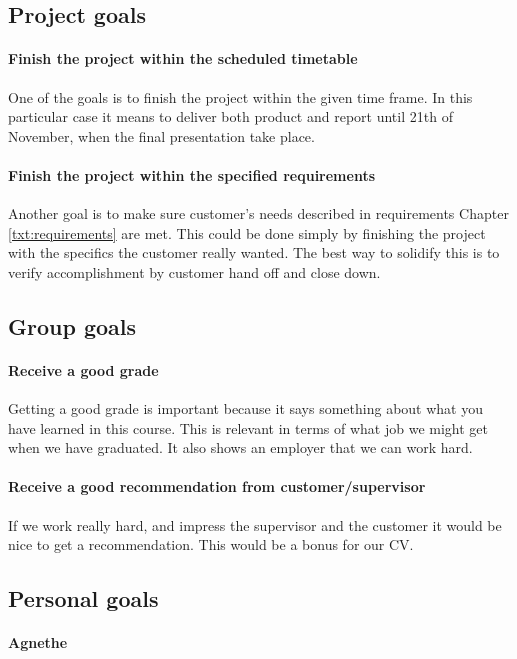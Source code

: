 \label{sec:project-goals}

\subsection{Project goals}

\paragraph{Finish the project within the scheduled timetable}
One of the goals is to finish the project within the given time frame. 
In this particular case it means to deliver both product and report until 21th of November, when the final presentation take place.

\paragraph{Finish the project within the specified requirements}
Another goal is to make sure customer's needs described in requirements Chapter \ref{txt:requirements} are met.
This could be done simply by finishing the project with the specifics the customer really wanted. 
The best way to solidify this is to verify accomplishment by customer hand off and close down.

\subsection{Group goals}
\paragraph{Receive a good grade}
Getting a good grade is important because it says something about what you have learned in this course. 
This is relevant in terms of what job we might get when we have graduated. It also shows an employer that we can work hard. 
\paragraph{Receive a good recommendation from customer/supervisor}
If we work really hard, and impress the supervisor and the customer it would be nice to get a recommendation. This would be a bonus for our CV.

\subsection{Personal goals}
\paragraph{Agnethe}

